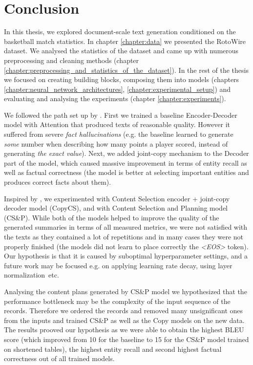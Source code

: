 \chapter*{Conclusion}

In this thesis, we explored document-scale text generation conditioned on the basketball match statistics. In chapter \ref{chapter:data} we presented the RotoWire dataset. We analysed the statistics of the dataset and came up with numerous preprocessing and cleaning methods (chapter \ref{chapter:preprocessing_and_statistics_of_the_dataset}). In the rest of the thesis we focused on creating building blocks, composing them into models (chapters \ref{chapter:neural_network_architectures}, \ref{chapter:experimental_setup}) and evaluating and analysing the experiments (chapter \ref{chapter:experiments}).

We followed the path set up by \citet{wiseman2017}. First we trained a baseline Encoder-Decoder model with Attention that produced texts of reasonable quality. However it suffered from severe \emph{fact hallucinations} (e.g. the baseline learned to generate \emph{some} number when describing how many points a player scored, instead of generating \emph{the exact value}). Next, we added joint-copy mechanism to the Decoder part of the model, which caused massive improvement in terms of entity recall as well as factual correctness (the model is better at selecting important entities and produces correct facts about them).

Inspired by \citet{puduppully2019datatotext}, we experimented with Content Selection encoder + joint-copy decoder model (CopyCS), and with Content Selection and Planning model (CS\&P). While both of the models helped to improve the quality of the generated summaries in terms of all measured metrics, we were not satisfied with the texts as they contained a lot of repetitions and in many cases they were not properly finished (the models did not learn to place correctly the \emph{\textless EOS\textgreater} token). Our hypothesis is that it is caused by suboptimal hyperparameter settings, and a future work may be focused e.g. on applying learning rate decay, using layer normalization~etc.

Analysing the content plans generated by CS\&P model we hypothesized that the performance bottleneck may be the complexity of the input sequence of the records. Therefore we ordered the records and removed many unsignificant ones from the inputs and trained CS\&P as well as the Copy models on the new data. The results prooved our hypothesis as we were able to obtain the highest BLEU score (which improved from 10 for the baseline to 15 for the CS\&P model trained on shortened tables), the highest entity recall and second highest factual correctness out of all trained models.

